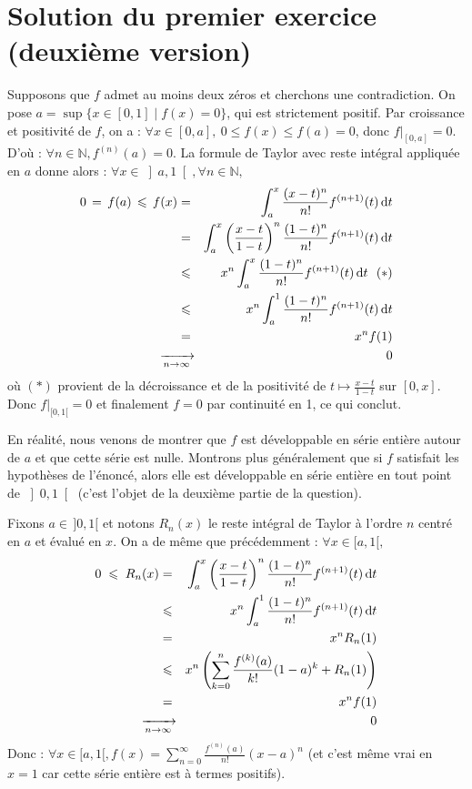 \section{Solution du premier exercice (deuxième version)} %

Supposons que $f$ admet au moins deux zéros et cherchons une contradiction. On pose $a = \sup \{x\in  [0,1] \mid f(x) = 0 \}$, qui est strictement positif. Par croissance et positivité de $f$, on a : $\forall x\in [0,a],\ 0\leqslant f(x)\leqslant f(a)=0$, donc $f|_{[0,a]} = 0$. D'où : $\forall n\in \mathbb{N}, f^{(n)} (a) = 0$. La formule de Taylor avec reste intégral appliquée en $a$ donne alors : $\forall  x \in  \left]a,1\right[, \forall  n\in \mathbb{N},$
\begin{eqnarray*}
0 \,=\, f(a) \,\leqslant \, f(x) &=& \int _{a} ^{x} \frac{(x-t)^{n} }{n!} f^{(n+1)}(t) \,\mathrm{d}t\\
&=& \int _{a} ^{x} \left( \frac{x-t}{1-t} \right)^{n} \frac{(1-t)^{n} }{n!} f^{(n+1)}(t) \,\mathrm{d}t\\
&\leqslant & x^{n} \int _{a} ^{x} \frac{(1-t)^{n} }{n!} f^{(n+1)}(t) \,\mathrm{d}t \ \ (*)\\
&\leqslant & x^{n} \int _{a} ^{1} \frac{(1-t)^{n} }{n!} f^{(n+1)}(t) \,\mathrm{d}t\\
&=& x^{n} f(1) \\
&\text{\makebox[0mm]{$\xrightarrow[n\rightarrow\infty]{}$}} & \ \ 0
\end{eqnarray*}
où $(*)$ provient de la décroissance et de la positivité de $t\mapsto\frac{x-t}{1-t}$ sur $[0,x]$. Donc $f|_{[0,1[} =0$ et finalement $f=0$ par continuité en 1, ce qui conclut.

En réalité, nous venons de montrer que $f$ est développable en série entière autour de $a$ et que cette série est nulle. Montrons plus généralement que si $f$ satisfait les hypothèses de l'énoncé, alors elle est développable en série entière en tout point de $\left]0,1\right[$ (c'est l'objet de la deuxième partie de la question).

Fixons $a\in \,]0,1[$ et notons $R_{n} (x)$ le reste intégral de Taylor à l'ordre $n$ centré en $a$ et évalué en $x$. On a de même que précédemment : $\forall x\in [a,1[,$
\begin{eqnarray*}
0 \;\leqslant \; R_{n} (x) &=& \int _{a} ^{x} \left( \frac{x-t}{1-t} \right)^{n} \frac{(1-t)^{n} }{n!} f^{(n+1)}(t) \,\mathrm{d}t\\
&\leqslant & x^{n} \int _{a} ^{1} \frac{(1-t)^{n} }{n!} f^{(n+1)}(t) \,\mathrm{d}t\\
&=& x^{n} R_{n} (1)\\
&\leqslant & x^{n} \left(\sum_{k=0}^n \frac{f^{(k)}(a)}{k!} (1-a)^{k} +R_{n} (1)\right)\\
&=& x^{n} f(1) \\
&\text{\makebox[0mm]{$\xrightarrow[n\rightarrow\infty]{}$}} & \ \ 0
\end{eqnarray*}
Donc : $\forall x\in [a,1[,f(x)=\displaystyle \sum _{n=0} ^{\infty } \frac{f^{(n)}(a)}{n!} (x-a)^{n}$ (et c'est même vrai en $x=1$ car cette série entière est à termes positifs).

